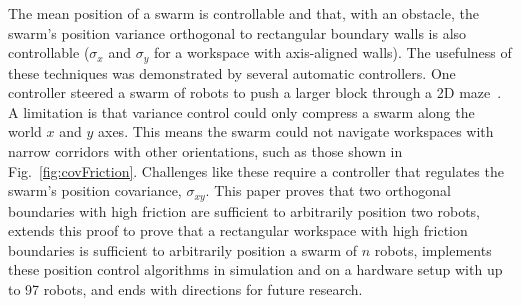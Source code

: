 The mean position of a swarm is controllable and that, with an obstacle, the swarm's position variance orthogonal to rectangular boundary walls is also controllable
($\sigma_x$ and $\sigma_y$ for a workspace with axis-aligned walls). 
The usefulness of these techniques was demonstrated by several automatic controllers. One controller steered a swarm of robots to push a larger block through a 2D maze~\citet{ShahrokhiIROS2015}. 
A limitation is that variance control could only compress a swarm along the world $x$ and $y$ axes.  This means the swarm could not navigate workspaces with narrow corridors with other orientations, such as those shown in Fig.\ \ref{fig:covFriction}.
Challenges like these require a controller that regulates the swarm's position covariance, $\sigma_{xy}$. 
This paper proves that two orthogonal boundaries with high friction are sufficient to arbitrarily position two robots, extends this proof to prove that a rectangular workspace with high friction boundaries is sufficient to arbitrarily position a swarm of $n$ robots, implements these position control algorithms in simulation and on a hardware setup with up to 97 robots, and ends with directions for future research.
